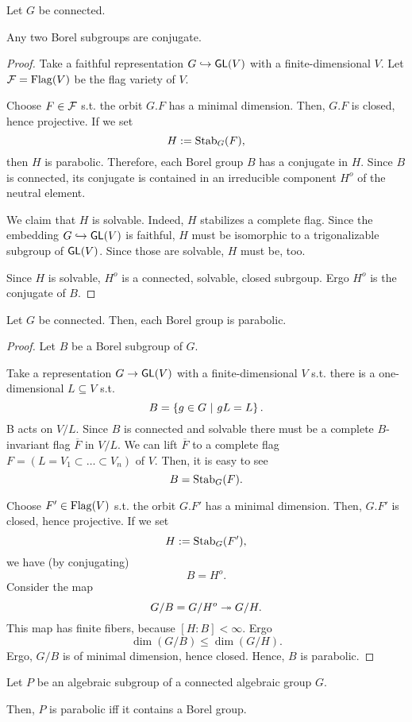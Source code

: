 \begin{theorem}
	Let $G$ be connected.
	 
	Any two Borel subgroups are conjugate.
\end{theorem}
\begin{proof}
Take a faithful representation $G \overset{}{\hookrightarrow} \textsf{GL}(V)$ with a finite-dimensional $V$. Let $\mathcal{F} = \mathrm{Flag}(V)$ be the flag variety of $V$.

Choose $F \in \mathcal{F}$ s.t. the orbit $G.F$ has a minimal dimension. Then, $G.F$ is closed, hence projective. If we set
\[ H:= \mathrm{Stab}_G(F), \]
then $H$ is parabolic. Therefore, each Borel group $B$ has a conjugate in $H$. Since $B$ is connected, its conjugate is contained in an irreducible component $H^o$ of the neutral element.

We claim that $H$ is solvable. Indeed, $H$ stabilizes a complete flag. Since the embedding $G \overset{}{\hookrightarrow} \textsf{GL}(V)$ is faithful, $H$ must be isomorphic to a trigonalizable subgroup of $\textsf{GL}(V)$. Since those are solvable, $H$ must be, too.

Since $H$ is solvable, $H^o$ is a connected, solvable, closed subrgoup. Ergo $H^o$ is the conjugate of $B$.
\end{proof}
\begin{proposition}
Let $G$ be connected. Then, each Borel group is parabolic.
\end{proposition}
\begin{proof}
	Let $B$ be a Borel subgroup of $G$.
	
	Take a representation $G \overset{}{\rightarrow} \textsf{GL}(V)$ with a finite-dimensional $V$ s.t. there is a one-dimensional $L \subseteq V$ s.t.
	\[ B = \left\lbrace g \in G ~ | ~ gL = L\right\rbrace.\]
	B acts on $V/L$. Since $B$ is connected and solvable there must be a complete $B$-invariant flag $\overline{F}$ in $V/L$. We can lift $\overline{F}$ to a complete flag $F = (L=V_1 \subset \ldots \subset V_n)$ of $V$. Then, it is easy to see
	\[  B= \mathrm{Stab}_G(F). \]
	
	Choose $F' \in \mathrm{Flag}(V)$ s.t. the orbit $G.F'$ has a minimal dimension. Then, $G.F'$ is closed, hence projective. If we set
	\[ H:= \mathrm{Stab}_G(F'), \]
	we have (by conjugating)
	\[ B = H^o.\]
	Consider the map
	\[ G/B = G/H^o \overset{}{\twoheadrightarrow} G/H. \]
	This map has finite fibers, because $[H: B] < \infty$. Ergo
	\[ \dim(G / B) \leq \dim(G/H). \]
	Ergo, $G/B$ is of minimal dimension, hence closed. Hence, $B$ is parabolic.
\end{proof}
\begin{corollary}
	Let $P$ be an algebraic subgroup of a connected algebraic group $G$.
	
	Then, $P$ is parabolic iff it contains a Borel group.
\end{corollary}
